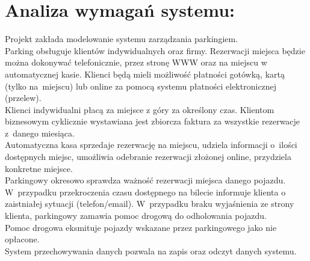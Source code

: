 \newpage
\section{Analiza wymagań systemu:}
\Large
Projekt zakłada modelowanie systemu zarządzania parkingiem. \\

Parking obsługuje klientów indywidualnych oraz firmy. Rezerwacji miejsca będzie można dokonywać telefonicznie, przez stronę WWW oraz na miejscu w automatycznej kasie. Klienci będą mieli możliwość płatności gotówką, kartą (tylko na~miejscu) lub online za pomocą systemu płatności elektronicznej (przelew). \\

Klienci indywidualni płacą za miejsce z góry za określony czas. Klientom biznesowym cyklicznie wystawiana jest zbiorcza faktura za wszystkie rezerwacje z~danego miesiąca. \\

Automatyczna kasa sprzedaje rezerwację na miejscu, udziela informacji o~ilości dostępnych miejsc, umożliwia odebranie rezerwacji złożonej online, przydziela konkretne miejsce. \\

Parkingowy okresowo sprawdza ważność rezerwacji miejsca danego pojazdu. W~przypadku przekroczenia czasu dostępnego na bilecie informuje klienta o zaistniałej sytuacji (telefon/email). W~przypadku braku wyjaśnienia ze strony klienta, parkingowy zamawia pomoc drogową do odholowania pojazdu. \\

Pomoc drogowa eksmituje pojazdy wskazane przez parkingowego jako nie opłacone. \\

System przechowywania danych pozwala na zapis oraz odczyt danych systemu.